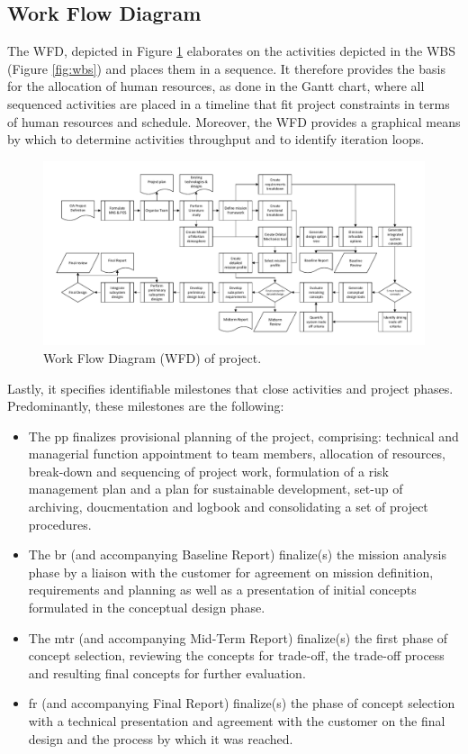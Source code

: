 \subsection{Work Flow Diagram}\label{sec:WFD}
The WFD, depicted in Figure \ref{fig:wfd} elaborates on the activities depicted in the WBS (Figure \ref{fig:wbs}) and places them in a sequence. It therefore provides the basis for the allocation of human resources, as done in the Gantt chart, where all sequenced activities are placed in a timeline that fit project constraints in terms of human resources and schedule. Moreover, the WFD provides a graphical means by which to determine activities throughput and to identify iteration loops. 

\begin{figure}
    \includegraphics[scale=0.8]{Figure/WFD2.pdf}
    \caption{Work Flow Diagram (WFD) of project.}
    \label{fig:wfd}
\end{figure}

Lastly, it specifies identifiable milestones that close activities and project phases. Predominantly, these milestones are the following:
\begin{itemize}
\item The \gls{pp} finalizes provisional planning of the project, comprising: technical and managerial function appointment to team members, allocation of resources, break-down and sequencing of project work, formulation of a risk management plan and a plan for sustainable development, set-up of archiving, doucmentation and logbook and consolidating a set of project procedures.
\item The \gls{br} (and accompanying Baseline Report) finalize(s) the mission analysis phase by a liaison with the customer for agreement on mission definition, requirements and planning as well as a presentation of initial concepts formulated in the conceptual design phase.
\item The \gls{mtr} (and accompanying Mid-Term Report) finalize(s) the first phase of concept selection, reviewing the concepts for trade-off, the trade-off process and resulting final concepts for further evaluation.
\item \gls{fr} (and accompanying Final Report) finalize(s) the phase of concept selection with a technical presentation and agreement with the customer on the final design and the process by which it was reached. 
\end{itemize}

